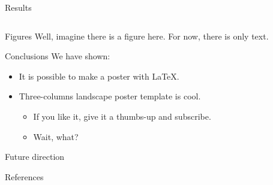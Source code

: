 \documentclass[final]{beamer}
\begin{document}
\begin{frame}
\begin{multicols}{3}
\begin{column}{.33\textwidth}
\begin{block}{Results}
  \justify
  \lipsum[5-6]
\end{block}
\end{column}

\begin{column}{.33\textwidth}

\begin{block}{Figures}
  \justify
  Well, imagine there is a figure here. For now, there is only text. \\
  \lipsum[7-8]
\end{block}

\begin{block}{Conclusions}
  We have shown:
  \begin{itemize}
    \item It is possible to make a poster with \LaTeX.
    \item Three-columns landscape poster template is cool.
    \begin{itemize}
      \item If you like it, give it a thumbs-up and subscribe.
      \item Wait, what?
    \end{itemize}
  \end{itemize}
\end{block}

\begin{block}{Future direction}
  \justify
  \lipsum[9]
\end{block}

\begin{block}{References}
  \justify
    \small %
    \nocite{*} %
    
        
\end{block}
\end{column}

\end{multicols}
\end{frame}
\end{document}

